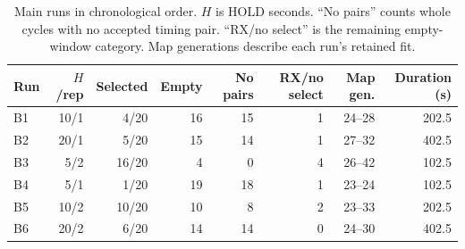 \documentclass[11pt,letterpaper]{article}
\begin{document}
\begin{table}[t]
\centering\small
\caption{Main runs in chronological order. $H$ is HOLD seconds. ``No pairs'' counts whole cycles with no accepted timing pair. ``RX/no select'' is the remaining empty-window category. Map generations describe each run's retained fit.}\label{tab:availability}
\begin{tabular}{lrrrrrrr}\toprule
Run & $H$/rep & Selected & Empty & No pairs & RX/no select & Map gen. & Duration (s)\\\midrule
B1 & 10/1 & 4/20 & 16 & 15 & 1 & 24--28 & 202.5\\
B2 & 20/1 & 5/20 & 15 & 14 & 1 & 27--32 & 402.5\\
B3 & 5/2 & 16/20 & 4 & 0 & 4 & 26--42 & 102.5\\
B4 & 5/1 & 1/20 & 19 & 18 & 1 & 23--24 & 102.5\\
B5 & 10/2 & 10/20 & 10 & 8 & 2 & 23--33 & 202.5\\
B6 & 20/2 & 6/20 & 14 & 14 & 0 & 24--30 & 402.5\\\bottomrule
\end{tabular}
\end{table}
\end{document}

